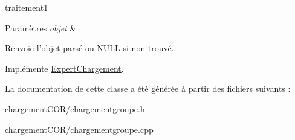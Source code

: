 traitement1 


\begin{DoxyParams}{Paramètres}
{\em objet} & \\
\hline
\end{DoxyParams}
\begin{DoxyReturn}{Renvoie}
l'objet parsé ou N\+U\+L\+L si non trouvé. 
\end{DoxyReturn}


Implémente \hyperlink{class_expert_chargement_a7d7818bdd5f0a06b06bfc8047ec8fee5}{Expert\+Chargement}.



La documentation de cette classe a été générée à partir des fichiers suivants \+:\begin{DoxyCompactItemize}
\item 
chargement\+C\+O\+R/chargementgroupe.\+h\item 
chargement\+C\+O\+R/chargementgroupe.\+cpp\end{DoxyCompactItemize}
